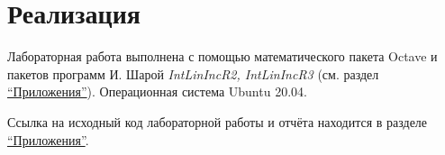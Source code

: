 \section{Реализация}

Лабораторная работа выполнена с помощью математического пакета Octave и пакетов программ И. Шарой \textit{IntLinIncR2, IntLinIncR3} (см. раздел \hyperref[app]{``Приложения''}). Операционная система Ubuntu 20.04.

Ссылка на исходный код лабораторной работы и отчёта находится в разделе \hyperref[app]{``Приложения''}.